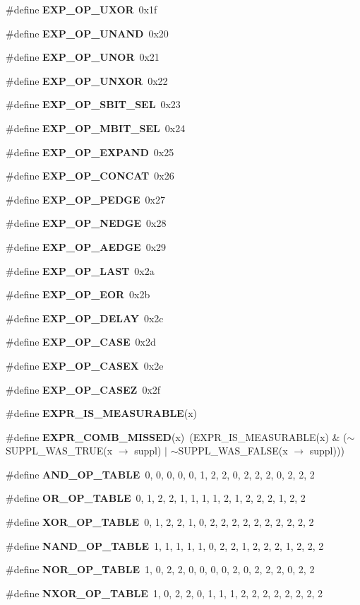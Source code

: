 \begin{CompactItemize}
\item 
\#define {\bf EXP\_\-OP\_\-UXOR}\ 0x1f
\item 
\#define {\bf EXP\_\-OP\_\-UNAND}\ 0x20
\item 
\#define {\bf EXP\_\-OP\_\-UNOR}\ 0x21
\item 
\#define {\bf EXP\_\-OP\_\-UNXOR}\ 0x22
\item 
\#define {\bf EXP\_\-OP\_\-SBIT\_\-SEL}\ 0x23
\item 
\#define {\bf EXP\_\-OP\_\-MBIT\_\-SEL}\ 0x24
\item 
\#define {\bf EXP\_\-OP\_\-EXPAND}\ 0x25
\item 
\#define {\bf EXP\_\-OP\_\-CONCAT}\ 0x26
\item 
\#define {\bf EXP\_\-OP\_\-PEDGE}\ 0x27
\item 
\#define {\bf EXP\_\-OP\_\-NEDGE}\ 0x28
\item 
\#define {\bf EXP\_\-OP\_\-AEDGE}\ 0x29
\item 
\#define {\bf EXP\_\-OP\_\-LAST}\ 0x2a
\item 
\#define {\bf EXP\_\-OP\_\-EOR}\ 0x2b
\item 
\#define {\bf EXP\_\-OP\_\-DELAY}\ 0x2c
\item 
\#define {\bf EXP\_\-OP\_\-CASE}\ 0x2d
\item 
\#define {\bf EXP\_\-OP\_\-CASEX}\ 0x2e
\item 
\#define {\bf EXP\_\-OP\_\-CASEZ}\ 0x2f
\item 
\#define {\bf EXPR\_\-IS\_\-MEASURABLE}(x)
\item 
\#define {\bf EXPR\_\-COMB\_\-MISSED}(x)\ (EXPR\_\-IS\_\-MEASURABLE(x) \& ($\sim$SUPPL\_\-WAS\_\-TRUE(x $\rightarrow$ suppl) $|$ $\sim$SUPPL\_\-WAS\_\-FALSE(x $\rightarrow$ suppl)))
\item 
\#define {\bf AND\_\-OP\_\-TABLE}\ 0,  0,  0,  0,  0,  1,  2,  2,  0,  2,  2,  2,  0,  2,  2,  2
\item 
\#define {\bf OR\_\-OP\_\-TABLE}\ 0,  1,  2,  2,  1,  1,  1,  1,  2,  1,  2,  2,  2,  1,  2,  2
\item 
\#define {\bf XOR\_\-OP\_\-TABLE}\ 0,  1,  2,  2,  1,  0,  2,  2,  2,  2,  2,  2,  2,  2,  2,  2
\item 
\#define {\bf NAND\_\-OP\_\-TABLE}\ 1,  1,  1,  1,  1,  0,  2,  2,  1,  2,  2,  2,  1,  2,  2,  2
\item 
\#define {\bf NOR\_\-OP\_\-TABLE}\ 1,  0,  2,  2,  0,  0,  0,  0,  2,  0,  2,  2,  2,  0,  2,  2
\item 
\#define {\bf NXOR\_\-OP\_\-TABLE}\ 1,  0,  2,  2,  0,  1,  1,  1,  2,  2,  2,  2,  2,  2,  2,  2

\end{CompactItemize}
